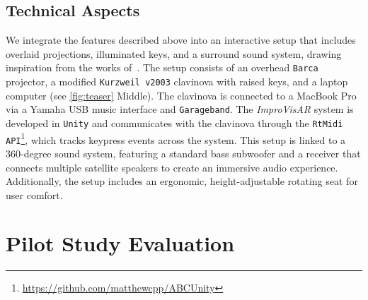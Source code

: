 \documentclass{vgtc}                          %
\begin{document}
\subsection{Technical Aspects}

\par %
We integrate the features described above into an interactive setup that includes overlaid projections, illuminated keys, and a surround sound system, drawing inspiration from the works of~\cite{rogers2014piano, weing2013piano}. The setup consists of an overhead \texttt{Barca} projector, a modified \texttt{Kurzweil v2003} clavinova with raised keys, and a laptop computer (see \autoref{fig:teaser} Middle). The clavinova is connected to a MacBook Pro via a Yamaha USB music interface and \texttt{Garageband}. The \textit{ImproVisAR} system is developed in \texttt{Unity} and communicates with the clavinova through the \texttt{RtMidi API}\footnote{\url{https://github.com/matthewcpp/ABCUnity}}, which tracks keypress events across the system. This setup is linked to a 360-degree sound system, featuring a standard bass subwoofer and a receiver that connects multiple satellite speakers to create an immersive audio experience. Additionally, the setup includes an ergonomic, height-adjustable rotating seat for user comfort.

\section{Pilot Study Evaluation}
\end{document}
